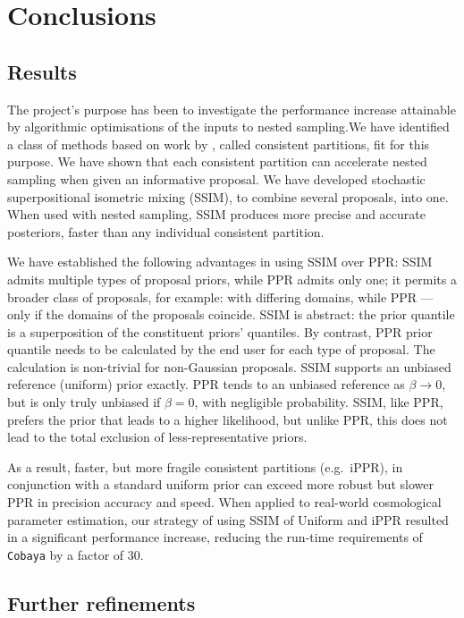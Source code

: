 \documentclass[usenatbib]{mnras}
\begin{document}
\section{Conclusions}\label{sec:orgdf2cbd9}

\subsection{Results}\label{sec:orgc48c55d}
The project's purpose has been to investigate the performance increase
attainable by algorithmic optimisations of the inputs to nested
sampling.We have identified a class of methods based on work by
\cite{chen-ferroz-hobson}, called consistent partitions, fit for this
purpose. We have shown that each consistent partition can accelerate
nested sampling when given an informative proposal.  We have developed
stochastic superpositional isometric mixing (SSIM), to combine several
proposals, into one. When used with nested sampling, SSIM produces
more precise and accurate posteriors, faster than any individual
consistent partition.

We have established the following advantages in using SSIM over PPR:
SSIM admits multiple types of proposal priors, while PPR admits only
one; it permits a broader class of proposals, for example: with
differing domains, while PPR --- only if the domains of the proposals
coincide.  SSIM is abstract: the prior quantile is a superposition of
the constituent priors' quantiles. By contrast, PPR prior quantile
needs to be calculated by the end user for each type of proposal. The
calculation is non-trivial for non-Gaussian proposals. SSIM supports
an unbiased reference (uniform) prior exactly. PPR tends to an
unbiased reference as \(\beta\rightarrow 0 \), but is only truly
unbiased if $\beta=0$, with negligible probability. SSIM, like PPR,
prefers the prior that leads to a higher likelihood, but unlike PPR,
this does not lead to the total exclusion of less-representative
priors.


As a result, faster, but more fragile consistent partitions
(e.g.~iPPR), in conjunction with a standard uniform prior can exceed
more robust but slower PPR in precision accuracy and speed.  When
applied to real-world cosmological parameter estimation, our strategy
of using SSIM of Uniform and iPPR resulted in a significant
performance increase, reducing the run-time requirements of
\texttt{Cobaya} by a factor of 30.

\subsection{Further refinements}\label{sec:org8314ddf}
\end{document}
